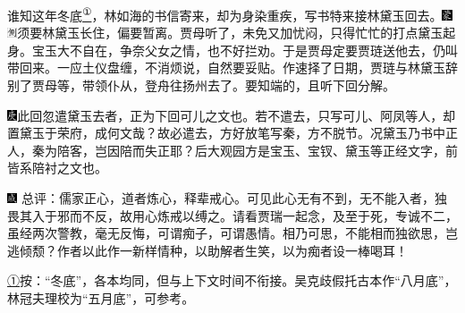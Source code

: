 谁知这年冬底\href{../Text/part0016_split_000.html\#lnkback_1_a}{\textsuperscript{①}}，林如海的书信寄来，却为身染重疾，写书特来接林黛玉回去。{\includegraphics[width=3mm]{../Images/00006}\includegraphics[width=3mm]{../Images/00011}\footnotesize \kaishu 须要林黛玉长住，偏要暂离。}贾母听了，未免又加忧闷，只得忙忙的打点黛玉起身。宝玉大不自在，争奈父女之情，也不好拦劝。于是贾母定要贾琏送他去，仍叫带回来。一应土仪盘缠，不消烦说，自然要妥贴。作速择了日期，贾琏与林黛玉辞别了贾母等，带领仆从，登舟往扬州去了。要知端的，且听下回分解。

{{\includegraphics[width=3mm]{../Images/00004}此回忽遣黛玉去者，正为下回可儿之文也。若不遣去，只写可儿、阿凤等人，却置黛玉于荣府，成何文哉？故必遣去，方好放笔写秦，方不脱节。况黛玉乃书中正人，秦为陪客，岂因陪而失正耶？后大观园方是宝玉、宝钗、黛玉等正经文字，前皆系陪衬之文也。}}

{\includegraphics[width=3mm]{../Images/00005}  \kaishu  总评：儒家正心，道者炼心，释辈戒心。可见此心无有不到，无不能入者，独畏其入于邪而不反，故用心炼戒以缚之。请看贾瑞一起念，及至于死，专诚不二，虽经两次警教，毫无反悔，可谓痴子，可谓愚情。相乃可思，不能相而独欲思，岂逃倾颓？作者以此作一新样情种，以助解者生笑，以为痴者设一棒喝耳！}

{\href{../Text/part0016_split_000.html\#navto_1_a}{①}按：``冬底''，各本均同，但与上下文时间不衔接。吴克歧假托古本作``八月底''，林冠夫理校为``五月底''，可参考。}
